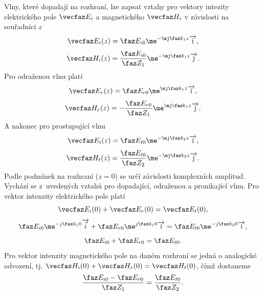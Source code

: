 Vlny, které dopadají na rozhraní, lze zapsat vztahy pro vektory intezity elektrického pole $\vecfaz E_{i}$ a magnetického $\vecfaz H_{i}$ v závislosti na souřadnici $z$
\begin{displaymath}
	\vecfaz E_{i}(z) = \faz E_{i0}\me^{-\mj\faz k_{1}z}\overrightarrow{\mathrm{i}},
\end{displaymath}
\begin{displaymath}
	\vecfaz H_{i}(z) = \frac{\faz E_{i0}}{\faz Z_{1}}\me^{-\mj\faz k_{1}z}\overrightarrow{\mathrm{j}}.
\end{displaymath}
Pro odraženou vlnu platí
\begin{displaymath}
	\vecfaz E_{r}(z) = \faz E_{r0}\me^{\mj\faz k_{1}z}\overrightarrow{\mathrm{i}},
\end{displaymath}
\begin{displaymath}
	\vecfaz H_{r}(z) = - \frac{\faz E_{r0}}{\faz Z_{1}}\me^{\mj\faz k_{1}z}\overrightarrow{\mathrm{j}}.
\end{displaymath}
A nakonec pro prostupující vlnu
\begin{displaymath}
	\vecfaz E_{t}(z) = \faz E_{t0}\me^{-\mj\faz k_{2}z}\overrightarrow{\mathrm{i}},
\end{displaymath}
\begin{displaymath}
	\vecfaz H_{t}(z) = \frac{\faz E_{t0}}{\faz Z_{2}}\me^{-\mj\faz k_{2}z}\overrightarrow{\mathrm{j}}.
\end{displaymath}
Podle podmínek na rozhraní ($z = 0$) se určí závislosti komplexních amplitud. Vychází se z~uvedených vztahů pro dopadající, odraženou a pronikající vlnu.
Pro vektor intenzity elektrického pole platí
\begin{displaymath}
	\vecfaz E_{i}(0) + \vecfaz E_{r}(0)  = \vecfaz E_{t}(0),
\end{displaymath}
\begin{displaymath}
	 \faz E_{i0}\me^{-j\faz k_{1}0}\overrightarrow{\vec{i}} + \faz E_{r0}\me^{j\faz k_{1}0}\overrightarrow{\mathrm{i}}  = \faz E_{t0}\me^{-j\faz k_{2}0}\overrightarrow{\mathrm{i}},
\end{displaymath}
\begin{equation}
	\faz E_{i0} + \faz E_{r0}  = \faz E_{t0}.
	\label{rce:evlny_rozhrani_E}
\end{equation}
Pro vektor intenzity magnetického pole na daném rozhraní se jedná o analogické odvození, tj. $\vecfaz H_{i}(0) + \vecfaz H_{r}(0)  = \vecfaz H_{t}(0)$, čímž dostaneme
\begin{equation}
	\frac{\faz E_{i0}-\faz E_{r0}}{\faz Z_{1}} = \frac{\faz E_{t0}}{\faz Z_{2}}.
	\label{rce:evlny_rozhrani_H}
\end{equation}
